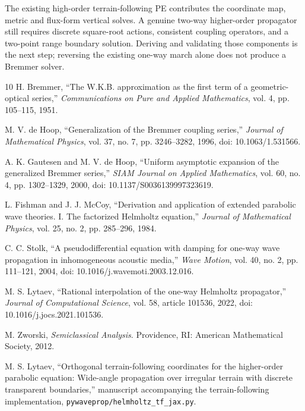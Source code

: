 \documentclass[11pt]{article}
\begin{document}
The existing high-order terrain-following PE contributes the coordinate map,
metric and flux-form vertical solves. A genuine two-way higher-order
propagator still requires discrete square-root actions, consistent coupling
operators, and a two-point range boundary solution. Deriving and validating
those components is the next step; reversing the existing one-way march alone
does not produce a Bremmer solver.

\begin{thebibliography}{10}
H. Bremmer, ``The W.K.B. approximation as the first term of a geometric-optical
series,'' \emph{Communications on Pure and Applied Mathematics}, vol. 4,
pp. 105--115, 1951.

M. V. de Hoop, ``Generalization of the Bremmer coupling series,''
\emph{Journal of Mathematical Physics}, vol. 37, no. 7, pp. 3246--3282, 1996,
doi: 10.1063/1.531566.

A. K. Gautesen and M. V. de Hoop, ``Uniform asymptotic expansion of the
generalized Bremmer series,'' \emph{SIAM Journal on Applied Mathematics},
vol. 60, no. 4, pp. 1302--1329, 2000, doi: 10.1137/S0036139997323619.

L. Fishman and J. J. McCoy, ``Derivation and application of extended
parabolic wave theories. I. The factorized Helmholtz equation,''
\emph{Journal of Mathematical Physics}, vol. 25, no. 2, pp. 285--296, 1984.

C. C. Stolk, ``A pseudodifferential equation with damping for one-way wave
propagation in inhomogeneous acoustic media,'' \emph{Wave Motion}, vol. 40,
no. 2, pp. 111--121, 2004, doi: 10.1016/j.wavemoti.2003.12.016.

M. S. Lytaev, ``Rational interpolation of the one-way Helmholtz propagator,''
\emph{Journal of Computational Science}, vol. 58, article 101536, 2022,
doi: 10.1016/j.jocs.2021.101536.

M. Zworski, \emph{Semiclassical Analysis}. Providence, RI: American
Mathematical Society, 2012.

M. S. Lytaev, ``Orthogonal terrain-following coordinates for the higher-order
parabolic equation: Wide-angle propagation over irregular terrain with
discrete transparent boundaries,'' manuscript accompanying the
terrain-following implementation, \texttt{pywaveprop/helmholtz\_tf\_jax.py}.
\end{thebibliography}
\end{document}
